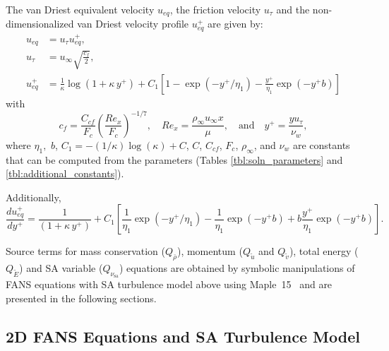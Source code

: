 \documentclass[10pt]{article}
\newcommand{\dd}[2]{\frac{d #1}{d #2}}
\newcommand{\sa}{\nu_{\mathrm{sa}}}
\newcommand{\brho}{\bar{\rho}}
\newcommand{\tu}{\tilde{u}}
\newcommand{\tv}{\tilde{v}}
\newcommand{\tE}{\tilde{E}}
\begin{document}
The van Driest equivalent velocity $u_{eq}$, the friction velocity $u_{\tau}$ and the non-dimensionalized van Driest velocity profile $u_{eq}^+$ are given by:
\begin{equation}
\begin{split}
u_{eq} &= u_{\tau} u_{eq}^+,\\
u_{\tau}  &= u_{\infty} \sqrt{\frac{c_f}{2}}, \\
u_{eq}^+ &= \frac{1}{\kappa } \log \left( 1 + \kappa \,  y^+ \right) + C_1 \left[ 1 - \exp({-y^+/\eta_1}) - \frac{y^+}{\eta_1} \exp({-y^+ b}) \right]
\end{split}
\end{equation}
with 
$$c_f = \dfrac{C_{cf}}{F_c} \left( \dfrac{Re_x}{F_c}  \right)^{-1/7}, \quad Re_x= \dfrac{\rho_{\infty} u_{\infty} x}{\mu}, \quad\text{and}\quad y^{+}= \dfrac{y u_\tau}{\nu_w},$$ 
where $\eta_1,$ $b$, $C_1 = -(1/\kappa ) \log(\kappa ) + C$, $C$, $C_{cf}$, $F_c$, $\rho_{\infty}$, and $\nu_w$ are constants that can be computed from the parameters
(Tables \ref{tbl:soln_parameters} and \ref{tbl:additional_constants}).

Additionally,
\begin{equation}\label{dueqplus}
\dd{u_{eq}^+}{y^+} = \frac{1}{\left( 1 + \kappa \,  y^+ \right)} + C_1 \left[ \frac{1}{\eta_1} \exp({-y^+/\eta_1}) - \frac{1}{\eta_1} \exp({-y^+ b}) + b \frac{y^+}{\eta_1} \exp({-y^+ b}) \right].
\end{equation}



Source terms  for mass conservation ($Q_{\brho}$), momentum ($Q_{\tu}$ and $Q_{\tv}$), total energy ($Q_{\tE}$) and SA variable ($Q_{\sa}$) equations are obtained by symbolic manipulations of FANS equations with SA turbulence model above using Maple~15~\citep{Maple15} and are presented in the following sections.



 \subsection{2D FANS Equations and SA Turbulence Model}\label{NS+SA}
\end{document}
